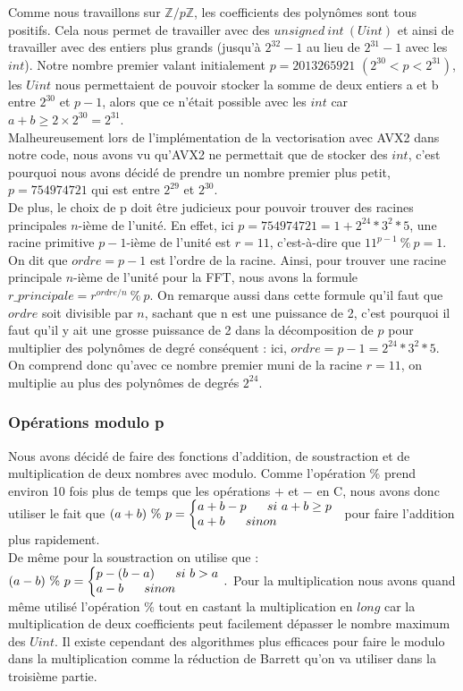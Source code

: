\documentclass[12pt, a4paper]{article}
\begin{document}
Comme nous travaillons sur $\mathbb{Z}/p\mathbb{Z}$, les coefficients des polynômes sont tous positifs. Cela nous permet de travailler avec des $unsigned\ int\ (Uint)$ et ainsi de travailler avec des entiers plus grands (jusqu’à $2^{32}-1$ au lieu de $2^{31}-1$ avec les $int$). Notre nombre premier valant initialement $p=2013265921$ $(2^{30} < p < 2^{31})$, les $Uint$ nous permettaient de pouvoir stocker la somme de deux entiers a et b entre $2^{30}$ et $p-1$, alors que ce n'était possible avec les $int$ car $a+b\geq2\times2^{30}=2^{31}$. \\
Malheureusement lors de l'implémentation de la vectorisation avec AVX2 dans notre code, nous avons vu qu'AVX2 ne permettait que de stocker des $int$, c'est pourquoi nous avons décidé de prendre un nombre premier plus petit, $p=754974721$ qui est entre $2^{29}$ et  $2^{30}$. \\
De plus, le choix de p doit être judicieux pour pouvoir trouver des racines principales $n$-ième de l'unité. En effet, ici $p = 754974721 = 1+2^{24}*3^2*5$, une racine primitive $p-1$-ième de l'unité est $r = 11$, c'est-à-dire que $11^{p-1}\ \%\ p = 1$. On dit que $ordre = p-1$ est l'ordre de la racine. Ainsi, pour trouver une racine principale $n$-ième de l'unité pour la FFT, nous avons la formule $r\_principale = r^{ordre/n}\ \% \ p$. On remarque aussi dans cette formule qu'il faut que $ordre$ soit divisible par $n$, sachant que n est une puissance de 2, c'est pourquoi il faut qu'il y ait une grosse puissance de 2 dans la décomposition de $p$ pour multiplier des polynômes de degré conséquent : ici, $ordre = p-1 = 2^{24}*3^2*5$. On comprend donc qu'avec ce nombre premier muni de la racine $r = 11$, on multiplie au plus des polynômes de degrés $2^{24}$.

\subsubsection{Opérations modulo p}

Nous avons décidé de faire des fonctions d'addition, de soustraction et de multiplication de deux nombres avec modulo. Comme l'opération $\%$ prend environ 10 fois plus de temps que les opérations $+$ et $-$ en C, nous avons donc utiliser le fait que 
$ (a+b)\ \%\ p = 
\left\{\begin{array}{@{}l@{}}
a + b - p\ \ \ \ \ si\ a+b \geq p\\
a + b\ \ \ \ \ sinon
\end{array}\right.\,\ $ pour faire l'addition plus rapidement. \\
De même pour la soustraction on utilise que :
$ (a-b)\ \%\ p = 
\left\{\begin{array}{@{}l@{}}
p - (b - a)\ \ \ \ \ si\ b > a\\
a - b\ \ \ \ \ sinon
\end{array}\right.\,.$
Pour la multiplication nous avons quand même utilisé l'opération $\%$ tout en castant la multiplication en $long$ car la multiplication de deux coefficients peut facilement dépasser le nombre maximum des $Uint$. Il existe cependant des algorithmes plus efficaces pour faire le modulo dans la multiplication comme la réduction de Barrett qu'on va utiliser dans la troisième partie.
\end{document}

